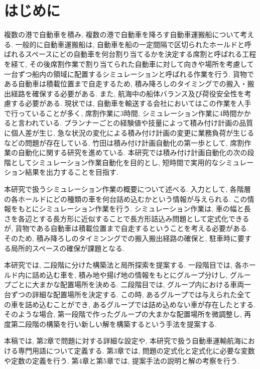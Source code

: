 \chapter{はじめに}

複数の港で自動車を積み, 複数の港で自動車を降ろす自動車運搬船について考える. 
一般的に自動車運搬船は, 自動車を船の一定間隔で区切られたホールドと呼ばれるスペースにどの自動車を何台割り当てるかを決定する席割と呼ばれる工程を経て, 
その後席割作業で割り当てられた自動車に対して向きや場所を考慮して一台ずつ船内の領域に配置するシミュレーションと呼ばれる作業を行う. 
貨物である自動車は積載位置まで自走するため, 積み降ろしのタイミングでの搬入・搬出経路を確保する必要がある. 
また, 航海中の船体バランス及び荷役安全性を考慮する必要がある. 
現状では, 自動車を輸送する会社においてはこの作業を人手で行っていることが多く, 席割作業に3時間, シミュレーション作業に4時間かかると言われている\cite{mitsui}. 
プランナーごとの経験値や技量によって積み付け計画の品質に個人差が生じ, 急な状況の変化による積み付け計画の変更に業務負荷が生じるなどの問題が存在している. 
竹田\cite{takeda}は積み付け計画自動化の第一歩として, 席割作業の自動化に関する研究を進めている. 
本研究では積み付け計画自動化の次の段階としてシミュレーション作業自動化を目的とし, 短時間で実用的なシミュレーション結果を出力することを目指す.  

本研究で扱うシミュレーション作業の概要について述べる. 
入力として, 各階層の各ホールドにどの種類の車を何台詰め込むかという情報が与えられる. 
この情報をもとにシミュレーション作業を行う. 
シミュレーション作業は, 車の幅と長さを各辺とする長方形に近似することで長方形詰込み問題として定式化できるが, 貨物である自動車は積載位置まで自走するということを考える必要がある. 
そのため, 積み降ろしのタイミンングでの搬入搬出経路の確保と, 駐車時に要する局所的スペースの確保が課題となる. 

本研究では, 二段階に分けた構築法と局所探索を提案する. 
一段階目では, 各ホールド内に詰め込む車を, 積み地や揚げ地の情報をもとにグループ分けし, グループごとに大まかな配置場所を決める. 
二段階目では, グループ内における車両一台ずつの詳細な配置場所を決定する. 
この時, あるグループでは与えられた全ての車を詰め込むことができ, あるグループでは詰め込めない車が存在したとする. 
そのような場合, 第一段階で作ったグループの大まかな配置場所を微調整し, 再度第二段階の構築を行い新しい解を構築するという手法を提案する. 


本稿では, 第2章で問題に対する詳細な設定や, 本研究で扱う自動車運輸航海における専門用語について定義する. 
第3章では, 問題の定式化と定式化に必要な変数や定数の定義を行う. 
第4章と第5章では, 提案手法の説明と解の考察を行う. 

